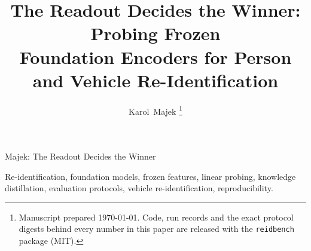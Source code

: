 \documentclass[journal]{IEEEtran}
\begin{document}
\title{The Readout Decides the Winner: Probing Frozen\\Foundation Encoders for Person and
Vehicle Re-Identification}

\author{Karol~Majek%
\thanks{Manuscript prepared \today. Code, run records and the exact protocol digests behind
every number in this paper are released with the \texttt{reidbench} package (MIT).}}

%
{Majek: The Readout Decides the Winner}

\maketitle



\begin{IEEEkeywords}
Re-identification, foundation models, frozen features, linear probing, knowledge distillation,
evaluation protocols, vehicle re-identification, reproducibility.
\end{IEEEkeywords}
















\end{document}
